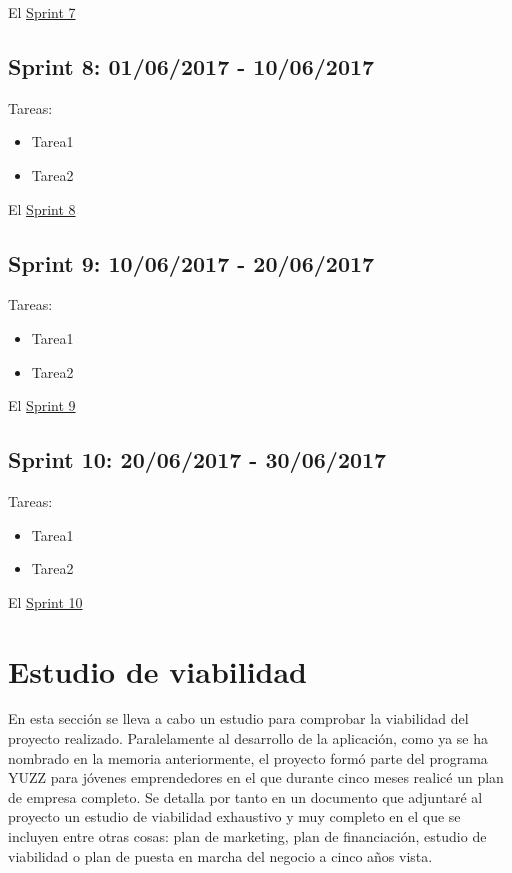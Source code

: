 
El \underline{Sprint 7} 

\subsection{Sprint 8: 01/06/2017 - 10/06/2017}\label{sprint8}

Tareas:

\begin{itemize}
	\item Tarea1
	\item Tarea2
\end{itemize}


El \underline{Sprint 8} 

\subsection{Sprint 9: 10/06/2017 - 20/06/2017}\label{sprint9}

Tareas:

\begin{itemize}
	\item Tarea1
	\item Tarea2
\end{itemize}


El \underline{Sprint 9} 

\subsection{Sprint 10: 20/06/2017 - 30/06/2017}\label{sprint10}

Tareas:

\begin{itemize}
	\item Tarea1
	\item Tarea2
\end{itemize}


El \underline{Sprint 10} 


\section{Estudio de viabilidad}\label{estudio-viabilidad}
En esta sección se lleva a cabo un estudio para comprobar la viabilidad del proyecto realizado. Paralelamente al desarrollo de la aplicación, como ya se ha nombrado en la memoria anteriormente, el proyecto formó parte del programa YUZZ para jóvenes emprendedores en el que durante cinco meses realicé un plan de empresa completo. Se detalla por tanto en un documento que adjuntaré al proyecto un estudio de viabilidad exhaustivo  y muy completo en el que se incluyen entre otras cosas: plan de marketing, plan de financiación, estudio de viabilidad o plan de puesta en marcha del negocio a cinco años vista. 

